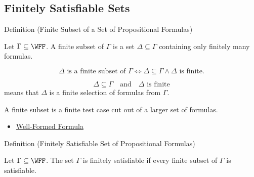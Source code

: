 \subsection*{Finitely Satisfiable Sets}

\begin{definitionbox}{Definition (Finite Subset of a Set of Propositional Formulas)}
\begin{definition}
\label{def:finite-subset-of-set-of-propositional-formulas}
Let \(\Gamma\subseteq\WFF\). A finite subset of \(\Gamma\) is a set
\(\Delta\subseteq\Gamma\) containing only finitely many formulas.
\end{definition}
\end{definitionbox}

\begin{remark*}
\[
\Delta\text{ is a finite subset of }\Gamma
\Longleftrightarrow
\Delta\subseteq\Gamma\land \Delta\text{ is finite}.
\]
\end{remark*}

\begin{remark*}
\[
\Delta\subseteq\Gamma
\quad\text{and}\quad
\Delta\text{ is finite}
\]
means that \(\Delta\) is a finite selection of formulas from \(\Gamma\).
\end{remark*}

\begin{remark*}[Interpretation]
A finite subset is a finite test case cut out of a larger set of formulas.
\end{remark*}

\begin{dependencies}
\begin{itemize}
  \item \hyperref[def:well-formed-formula]{Well-Formed Formula}
\end{itemize}
\end{dependencies}

\begin{definitionbox}{Definition (Finitely Satisfiable Set of Propositional Formulas)}
\begin{definition}
\label{def:finitely-satisfiable-set-of-propositional-formulas}
Let \(\Gamma\subseteq\WFF\). The set \(\Gamma\) is finitely satisfiable if every
finite subset of \(\Gamma\) is satisfiable.
\end{definition}
\end{definitionbox}


